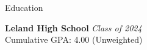 \documentclass[
	11pt, %
]{tex/resume} %
\begin{document}

\begin{rSection}{Education}
	
	\textbf{Leland High School} \hfill \textit{Class of 2024} \\ 
	Cumulative GPA: 4.00 (Unweighted)
	
\end{rSection}

\end{document}

